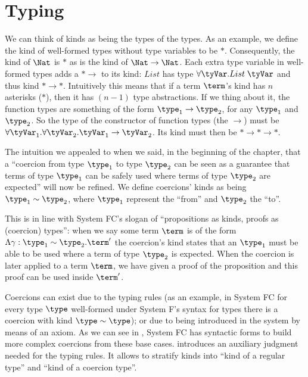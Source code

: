 \section{Typing}
We can think of kinds as being the types of the types. As an example, we define the kind of well-formed types without type variables to be $*$. Consequently, the kind of $\Nat$ is $*$ as is the kind of $\Nat \rightarrow \Nat$. Each extra type variable in well-formed types adds a $*\rightarrow$ to its kind: $List$ has type $\forall \tyVar . List \; \tyVar$ and thus kind $*\rightarrow *$. Intuitively this means that if a term $\term$'s kind has $n$ asterisks ($*$), then it has $(n-1)$ type abstractions. If we thing about it, the function types are something of the form $\type_1 \rightarrow \type_2$, for any $\type_1$ and $\type_2$. So the type of the constructor of function types (the $\rightarrow$) must be $\forall \tyVar_1 . \forall \tyVar_2 . \tyVar_1 \rightarrow \tyVar_2$. Its kind must then be $*\rightarrow *\rightarrow *$.

The intuition we appealed to when we said, in the beginning of the chapter, that a ``coercion from type $\type_1$ to type $\type_2$ can be seen as a guarantee that terms of type $\type_1$ can be safely used where terms of type $\type_2$ are expected'' will now be refined. We define coercions' kinds as being $\type_1 \sim \type_2$, where $\type_1$ represent the ``from'' and $\type_2$ the ``to''.

This is in line with System FC's slogan of ``propositions as kinds, proofs as (coercion) types'': when we say some term $\term$ is of the form $\Lambda \gamma:\type_1 \sim \type_2. \term'$ the coercion's kind states that an $\type_1$ must be able to be used where a term of type $\type_2$ is expected. When the coercion is later applied to a term $\term$, we have given a proof of the proposition and this proof can be used inside $\term'$.

Coercions can exist due to the typing rules (as an example, in System FC for every type $\type$ well-formed under System F's syntax for types there is a coercion with kind $ \type \sim \type$); or due to being introduced in the system by means of an axiom. As we can see in , System FC has syntactic forms to build more complex coercions from these base cases.  introduces an auxiliary judgment needed for the typing rules. It allows to stratify kinds into ``kind of a regular type'' and ``kind of a coercion type''.


